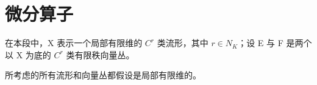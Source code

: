 \section{微分算子}

在本段中，X 表示一个局部有限维的 \(C^{r}\) 类流形，其中 \(r \in N_{K}\)；设 E 与 F 是两个以 X 为底的 \(C^{r}\) 类有限秩向量丛。

所考虑的所有流形和向量丛都假设是局部有限维的。

